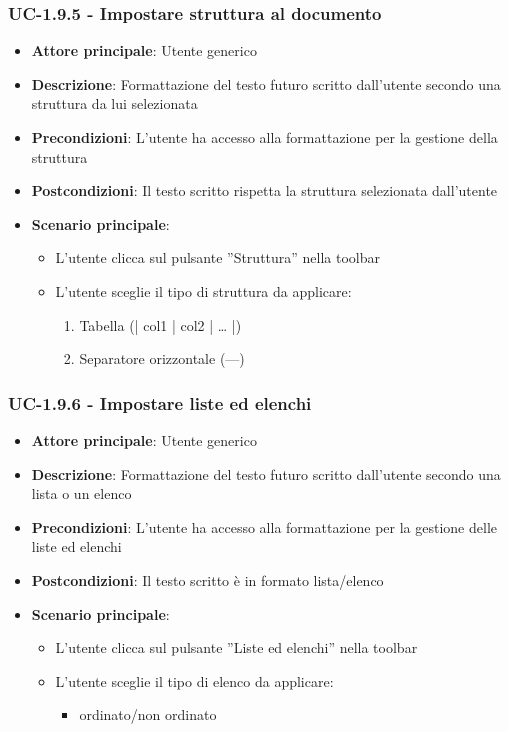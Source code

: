 \documentclass[11pt,a4paper]{article}
\begin{document}
\subsubsection{UC-1.9.5 - Impostare struttura al documento}
\begin{itemize}
    \item \textbf{Attore principale}: Utente generico
    \item \textbf{Descrizione}: Formattazione del testo futuro scritto dall’utente secondo una struttura da lui selezionata
    \item \textbf{Precondizioni}: L’utente ha accesso alla formattazione per la gestione della struttura
    \item \textbf{Postcondizioni}: Il testo scritto rispetta la struttura selezionata dall’utente
    \item \textbf{Scenario principale}:
        \begin{itemize}
            \item L’utente clicca sul pulsante ”Struttura” nella toolbar
            \item L’utente sceglie il tipo di struttura da applicare:
                \begin{enumerate}
                    \item Tabella (| col1 | col2 | … |)
                    \item Separatore orizzontale (---)
                \end{enumerate}
        \end{itemize}
\end{itemize}

\subsubsection{UC-1.9.6 - Impostare liste ed elenchi}
\begin{itemize}
    \item \textbf{Attore principale}: Utente generico
    \item \textbf{Descrizione}: Formattazione del testo futuro scritto dall’utente secondo una lista o un elenco
    \item \textbf{Precondizioni}: L’utente ha accesso alla formattazione per la gestione delle liste ed elenchi
    \item \textbf{Postcondizioni}: Il testo scritto è in formato lista/elenco
    \item \textbf{Scenario principale}:
        \begin{itemize}
            \item L’utente clicca sul pulsante ”Liste ed elenchi” nella toolbar
            \item L’utente sceglie il tipo di elenco da applicare:
                \begin{itemize}
                    \item ordinato/non ordinato
                \end{itemize}
        \end{itemize}
\end{itemize}
\end{document}
